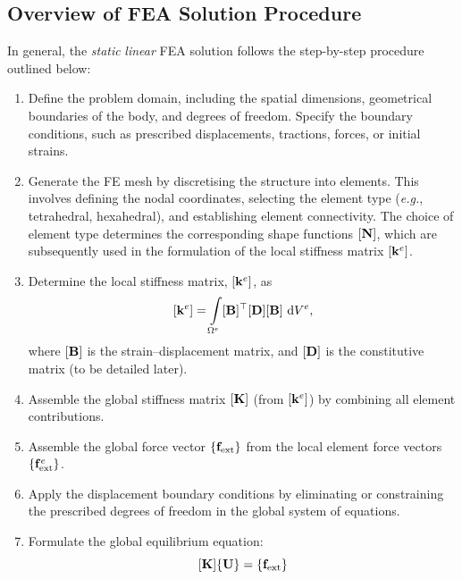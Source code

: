 \documentclass[12pt, a4paper]{article}
\numberwithin{equation}{section}
\begin{document}
\subsection{Overview of FEA Solution Procedure}
\label{sec:overview}

In general, the \textit{static} \textit{linear} FEA solution follows the step-by-step procedure outlined below:

\begin{enumerate}
    \item Define the problem domain, including the spatial dimensions, geometrical boundaries of the body, and degrees of freedom. Specify the boundary conditions, such as prescribed displacements, tractions, forces, or initial strains.

    \item Generate the FE mesh by discretising the structure into elements. This involves defining the nodal coordinates, selecting the element type (\textit{e.g.}, tetrahedral, hexahedral), and establishing element connectivity. The choice of element type determines the corresponding shape functions $[\mathbf{N}]$, which are subsequently used in the formulation of the local stiffness matrix $[\mathbf{k}^e]$.

    \item Determine the local stiffness matrix, $[\mathbf{k}^e]$, as
    \begin{equation}
    \label{eqn:elem_stiff_matrix}
        \kloc = \int\limits_{\Omega^{e}} \B^\top \D \B \ \mathrm{d}V^e,
    \end{equation}
    where $[\mathbf{B}]$ is the strain–displacement matrix, and $[\mathbf{D}]$ is the constitutive matrix (to be detailed later).

    \item Assemble the global stiffness matrix $[\mathbf{K}]$ (from $[\mathbf{k}^e]$) by combining all element contributions.

    \item Assemble the global force vector $\{\mathbf{f}_{\mathrm{ext}}\}$ from the local element force vectors $\{\mathbf{f}_{\mathrm{ext}}^e\}$.

    \item Apply the displacement boundary conditions by eliminating or constraining the prescribed degrees of freedom in the global system of equations.

    \item Formulate the global equilibrium equation:
    \begin{equation}
    \label{eqn:global_equi_eqn}
        [\mathbf{K}] \{\mathbf{U}\} = \{\mathbf{f}_{\mathrm{ext}}\}
    \end{equation}


\end{enumerate}
\end{document}

